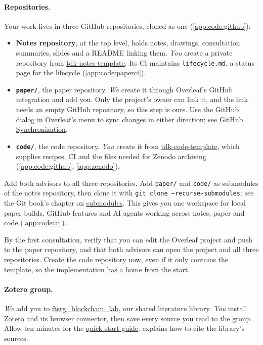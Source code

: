 \paragraph{Repositories.} Your work lives in three GitHub repositories, cloned as one (\cref{app:code:github}):
\begin{itemize}
  \item \textbf{Notes repository}, at the top level, holds notes, drawings, consultation summaries, slides and a README linking them. \emph{You} create a private repository from \href{https://github.com/BlackLight54/tdk-notes-template}{tdk-notes-template}. Its CI maintains \texttt{lifecycle.md}, a status page for the lifecycle (\cref{app:code:paperci}).
  \item \textbf{\texttt{paper/}}, the paper repository. \emph{We} create it through Overleaf's GitHub integration and add you. Only the project's owner can link it, and the link needs an empty GitHub repository, so this step is ours. Use the GitHub dialog in Overleaf's menu to sync changes in either direction; see \href{https://www.overleaf.com/learn/how-to/GitHub_Synchronization}{GitHub Synchronization}.
  \item \textbf{\texttt{code/}}, the code repository. \emph{You} create it from \href{https://github.com/BlackLight54/tdk-code-template}{tdk-code-template}, which supplies recipes, CI and the files needed for Zenodo archiving (\cref{app:code:github}, \cref{app:zenodo}).
\end{itemize}
Add both advisors to all three repositories. Add \texttt{paper/} and \texttt{code/} as submodules of the notes repository, then clone it with \texttt{git clone --recurse-submodules}; see the Git book's chapter on \href{https://git-scm.com/book/en/v2/Git-Tools-Submodules}{submodules}. This gives you one workspace for local paper builds, GitHub features and AI agents working across notes, paper and code (\cref{app:code:ai}).

By the first consultation, verify that you can edit the Overleaf project and push to the paper repository, and that both advisors can open the project and all three repositories. Create the code repository now, even if it only contains the template, so the implementation has a home from the start.

\paragraph{Zotero group.} \emph{We} add you to \href{https://www.zotero.org/groups/6715800/ftsrg_blockchain_lab}{ftsrg\_blockchain\_lab}, our shared literature library. \emph{You} install \href{https://www.zotero.org/}{Zotero} and its \href{https://www.zotero.org/download/connectors}{browser connector}, then save every source you read to the group. Allow ten minutes for the \href{https://www.zotero.org/support/quick_start_guide}{quick start guide}.  explains how to cite the library's sources.

